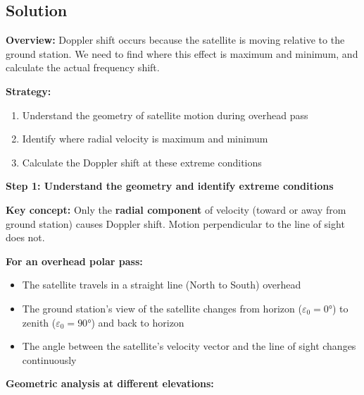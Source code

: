\documentclass[11pt,letterpaper]{article}
\begin{document}
\subsection{Solution}

\textbf{Overview:} Doppler shift occurs because the satellite is moving relative to the ground station. We need to find where this effect is maximum and minimum, and calculate the actual frequency shift.

\textbf{Strategy:}
\begin{enumerate}
    \item Understand the geometry of satellite motion during overhead pass
    \item Identify where radial velocity is maximum and minimum
    \item Calculate the Doppler shift at these extreme conditions
\end{enumerate}

\vspace{0.3cm}

\textbf{Step 1: Understand the geometry and identify extreme conditions}

\textbf{Key concept:} Only the \textbf{radial component} of velocity (toward or away from ground station) causes Doppler shift. Motion perpendicular to the line of sight does not.

\textbf{For an overhead polar pass:}

\begin{itemize}
    \item The satellite travels in a straight line (North to South) overhead
    \item The ground station's view of the satellite changes from horizon ($\varepsilon_0 = 0°$) to zenith ($\varepsilon_0 = 90°$) and back to horizon
    \item The angle between the satellite's velocity vector and the line of sight changes continuously
\end{itemize}

\textbf{Geometric analysis at different elevations:}
\end{document}
